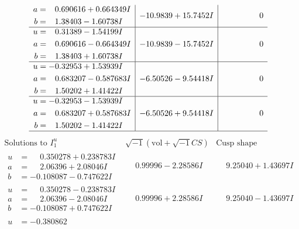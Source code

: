 \documentclass[1p]{elsarticle_modified}
\theoremstyle{definition}
\newcommand{\I}{\sqrt{-1}}
\begin{document}
$$\begin{array}{c|c|c}
\begin{aligned}
a &= \phantom{-}0.690616 + 0.664349 I \\
b &= \phantom{-}1.38403 - 1.60738 I\end{aligned}
 & -10.9839 + 15.7452 I & \phantom{-0.000000 } 0 \\ \hline\begin{aligned}
u &= \phantom{-}0.31389 - 1.54199 I \\
a &= \phantom{-}0.690616 - 0.664349 I \\
b &= \phantom{-}1.38403 + 1.60738 I\end{aligned}
 & -10.9839 - 15.7452 I & \phantom{-0.000000 } 0 \\ \hline\begin{aligned}
u &= -0.32953 + 1.53939 I \\
a &= \phantom{-}0.683207 - 0.587683 I \\
b &= \phantom{-}1.50202 + 1.41422 I\end{aligned}
 & -6.50526 - 9.54418 I & \phantom{-0.000000 } 0 \\ \hline\begin{aligned}
u &= -0.32953 - 1.53939 I \\
a &= \phantom{-}0.683207 + 0.587683 I \\
b &= \phantom{-}1.50202 - 1.41422 I\end{aligned}
 & -6.50526 + 9.54418 I & \phantom{-0.000000 } 0\\
 \hline 
 \end{array}$$\newpage$$\begin{array}{c|c|c}  
\text{Solutions to }I^u_{1}& \I (\text{vol} + \sqrt{-1}CS) & \text{Cusp shape}\\
 \hline 
\begin{aligned}
u &= \phantom{-}0.350278 + 0.238783 I \\
a &= \phantom{-}2.06396 + 2.08046 I \\
b &= -0.108087 - 0.747622 I\end{aligned}
 & \phantom{-}0.99996 - 2.28586 I & \phantom{-}9.25040 + 1.43697 I \\ \hline\begin{aligned}
u &= \phantom{-}0.350278 - 0.238783 I \\
a &= \phantom{-}2.06396 - 2.08046 I \\
b &= -0.108087 + 0.747622 I\end{aligned}
 & \phantom{-}0.99996 + 2.28586 I & \phantom{-}9.25040 - 1.43697 I \\ \hline\begin{aligned}
u &= -0.380862\phantom{ +0.000000I} \\

\end{aligned}
\end{array}$$
\end{document}
